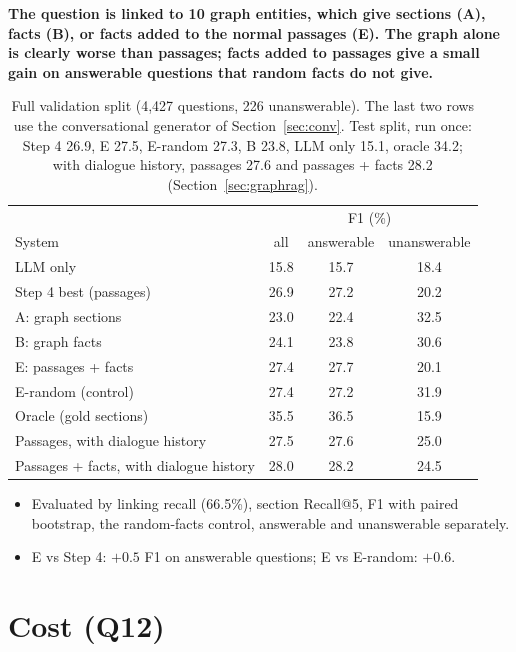 \documentclass[11pt,a4paper]{article}
\begin{document}
\textbf{The question is linked to 10 graph entities, which give sections (A), facts (B), or facts
added to the normal passages (E). The graph alone is clearly worse than passages; facts added to
passages give a small gain on answerable questions that random facts do not give.}

\begin{table}[H]
\centering\small
\begin{tabular}{lccc}
\toprule
 & \multicolumn{3}{c}{F1 (\%)} \\
System & all & answerable & unanswerable \\
\midrule
LLM only & 15.8 & 15.7 & 18.4 \\
Step 4 best (passages) & 26.9 & 27.2 & 20.2 \\
A: graph sections & 23.0 & 22.4 & 32.5 \\
B: graph facts & 24.1 & 23.8 & 30.6 \\
E: passages + facts & 27.4 & 27.7 & 20.1 \\
E-random (control) & 27.4 & 27.2 & 31.9 \\
Oracle (gold sections) & 35.5 & 36.5 & 15.9 \\
\midrule
Passages, with dialogue history & 27.5 & 27.6 & 25.0 \\
Passages + facts, with dialogue history & 28.0 & 28.2 & 24.5 \\
\bottomrule
\end{tabular}
\caption{Full validation split (4,427 questions, 226 unanswerable). The last two rows use the
conversational generator of Section~\ref{sec:conv}. Test split, run once: Step 4 26.9, E 27.5,
E-random 27.3, B 23.8, LLM only 15.1, oracle 34.2; with dialogue history, passages 27.6 and
passages + facts 28.2 (Section~\ref{sec:graphrag}).}
\label{tab:main}
\end{table}

\begin{itemize}
\item Evaluated by linking recall (66.5\%), section Recall@5, F1 with paired bootstrap, the
  random-facts control, answerable and unanswerable separately.
\item E vs Step 4: $+0.5$ F1 on answerable questions; E vs E-random: $+0.6$.
\end{itemize}

\section{Cost (Q12)}\label{sec:cost}
\end{document}
